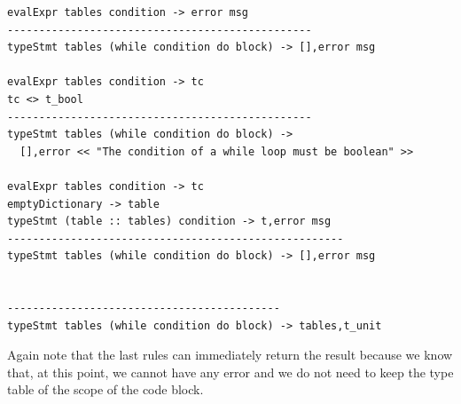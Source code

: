 \begin{lstlisting}
evalExpr tables condition -> error msg
------------------------------------------------
typeStmt tables (while condition do block) -> [],error msg

evalExpr tables condition -> tc
tc <> t_bool
------------------------------------------------
typeStmt tables (while condition do block) ->
  [],error << "The condition of a while loop must be boolean" >>
  
evalExpr tables condition -> tc
emptyDictionary -> table
typeStmt (table :: tables) condition -> t,error msg
-----------------------------------------------------
typeStmt tables (while condition do block) -> [],error msg


-------------------------------------------
typeStmt tables (while condition do block) -> tables,t_unit
\end{lstlisting}

\noindent
Again note that the last rules can immediately return the result because we know that, at this point, we cannot have any error and we do not need to keep the type table of the scope of the code block.

